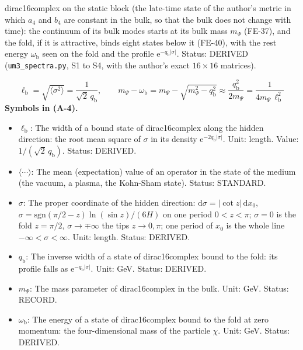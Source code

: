 \documentclass[
  10pt,
]{article}
\providecommand{\tightlist}{%
  \setlength{\itemsep}{0pt}\setlength{\parskip}{0pt}}
\begin{document}
dirac16complex on the static block (the late-time state of the author's
metric in which \(a_4\) and \(b_4\) are constant in the bulk, so that
the bulk does not change with time): the continuum of its bulk modes
starts at its bulk mass \(m_\Psi\) (FE-37), and the fold, if it is
attractive, binds eight states below it (FE-40), with the rest energy
\(\omega_{\mathrm{b}}\) seen on the fold and the profile
\(\mathrm{e}^{-q_{\mathrm{b}}\lvert\sigma\rvert}\). Status: DERIVED
(\texttt{um3\_spectra.py}, S1 to S4, with the author's exact
\(16 \times 16\) matrices).

\[
\ell_{\mathrm{b}} = \sqrt{\big\langle\sigma^2\big\rangle} = \frac{1}{\sqrt2\,q_{\mathrm{b}}},\qquad
m_\Psi - \omega_{\mathrm{b}} = m_\Psi - \sqrt{m_\Psi^2 - q_{\mathrm{b}}^2} \approx \frac{q_{\mathrm{b}}^2}{2m_\Psi} = \frac{1}{4m_\Psi\,\ell_{\mathrm{b}}^2} \tag{A-4}
\] \textbf{Symbols in (A-4).}

\begin{itemize}
\tightlist
\item
  \(\ell_{\mathrm{b}}\): The width of a bound state of dirac16complex
  along the hidden direction: the root mean square of \(\sigma\) in its
  density \(\mathrm{e}^{-2q_{\mathrm{b}}\lvert\sigma\rvert}\). Unit:
  length. Value: \(1/(\sqrt2\,q_{\mathrm{b}})\). Status: DERIVED.
\item
  \(\langle\cdots\rangle\): The mean (expectation) value of an operator
  in the state of the medium (the vacuum, a plasma, the Kohn-Sham
  state). Status: STANDARD.
\item
  \(\sigma\): The proper coordinate of the hidden direction:
  \(\mathrm{d}\sigma = \lvert\cot z\rvert\,\mathrm{d}x_0\),
  \(\sigma = \mathrm{sgn}(\pi/2 - z)\ln(\sin z)/(6H)\) on one period
  \(0 < z < \pi\); \(\sigma = 0\) is the fold \(z = \pi/2\),
  \(\sigma \to \mp\infty\) the tips \(z \to 0, \pi\); one period of
  \(x_0\) is the whole line \(-\infty < \sigma < \infty\). Unit: length.
  Status: DERIVED.
\item
  \(q_{\mathrm{b}}\): The inverse width of a state of dirac16complex
  bound to the fold: its profile falls as
  \(\mathrm{e}^{-q_{\mathrm{b}}\lvert\sigma\rvert}\). Unit: GeV. Status:
  DERIVED.
\item
  \(m_\Psi\): The mass parameter of dirac16complex in the bulk. Unit:
  GeV. Status: RECORD.
\item
  \(\omega_{\mathrm{b}}\): The energy of a state of dirac16complex bound
  to the fold at zero momentum: the four-dimensional mass of the
  particle \(\chi\). Unit: GeV. Status: DERIVED.
\end{itemize}
\end{document}
